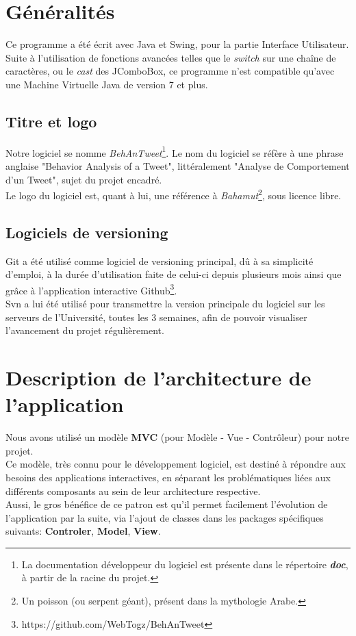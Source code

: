 \documentclass[pdftex,12pt,a4paper]{report}
\begin{document}
\begin{spacing}{1.2}
\section{Généralités}

Ce programme a été écrit avec Java et Swing, pour la partie Interface Utilisateur.
\\
Suite à l'utilisation de fonctions avancées telles que le \textit{switch} sur une chaîne de caractères, ou le \textit{cast} des JComboBox, ce programme n'est compatible qu'avec une Machine Virtuelle Java de version 7 et plus.

\subsection{Titre et logo}

Notre logiciel se nomme \textit{BehAnTweet}\footnote{La documentation développeur du logiciel est présente dans le répertoire \textit{\textbf{doc}}, à partir de la racine du projet.}. Le nom du logiciel se réfère à une phrase anglaise "Behavior Analysis of a Tweet", littéralement "Analyse de Comportement d'un Tweet", sujet du projet encadré.
\\
Le logo du logiciel est, quant à lui, une référence à \textit{Bahamut}\footnote{Un poisson (ou serpent géant), présent dans la mythologie Arabe.}, sous licence libre.

\subsection{Logiciels de versioning}

Git a été utilisé comme logiciel de versioning principal, dû à sa simplicité d'emploi, à la durée d'utilisation faite de celui-ci depuis plusieurs mois ainsi que grâce à l'application interactive Github\footnote{https://github.com/WebTogz/BehAnTweet}.\\
Svn a lui été utilisé pour transmettre la version principale du logiciel sur les serveurs de l'Université, toutes les 3 semaines, afin de pouvoir visualiser l'avancement du projet régulièrement.

\section{Description de l'architecture de l'application}

Nous avons utilisé un modèle \textbf{MVC} (pour Modèle - Vue - Contrôleur) pour notre projet.\\
Ce modèle, très connu pour le développement logiciel, est destiné à répondre aux besoins des applications interactives, en séparant les problématiques liées aux différents composants au sein de leur architecture respective.\\
Aussi, le gros bénéfice de ce patron est qu'il permet facilement l'évolution de l'application par la suite, via l'ajout de classes dans les packages spécifiques suivants: \textbf{Controler}, \textbf{Model}, \textbf{View}.


\end{spacing}
\end{document}
